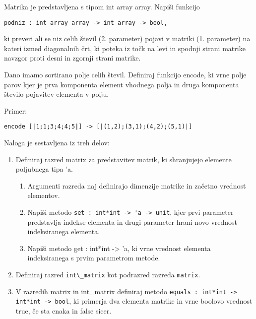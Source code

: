 \begin{ex}
Matrika je predstavljena s tipom int array array. Napi\v si funkcijo 
\begin{lstlisting}
podniz : int array array -> int array -> bool,
\end{lstlisting}
ki preveri ali se niz celih \v stevil (2. parameter) pojavi v matriki (1. parameter) na kateri izmed diagonalnih \v crt, ki poteka iz to\v ck na levi in spodnji strani matrike navzgor proti desni in zgornji strani matrike.


\end{ex} 
\begin{ex}
Dano imamo sortirano polje celih \v stevil. Definiraj funkcijo encode, ki vrne polje parov kjer je prva komponenta element vhodnega polja in druga komponenta \v stevilo pojavitev elementa v polju.   

Primer:
\begin{lstlisting}
encode [|1;1;3;4;4;5|] -> [|(1,2);(3,1);(4,2);(5,1)|]
\end{lstlisting}
\end{ex} 
\begin{ex} Naloga je sestavljena iz treh delov:
\begin{enumerate}
  \item  Definiraj razred matrix za predstavitev matrik, ki shranjujejo
  elemente poljubnega tipa 'a.
\begin{enumerate}
    \item Argumenti razreda naj definirajo dimenzije matrike in za\v cetno
  vrednost elementov.
  \item Napi\v si metodo 
  \lstinline{set : int*int -> 'a -> unit}, kjer prvi parameter
  predstavlja indekse elementa in drugi parameter hrani novo vrednost
  indeksiranega elementa.
  \item Napi\v si metodo get : int*int -> 'a, ki vrne vrednost elementa
  indeksiranega s prvim parametrom metode.
\end{enumerate}
       
  \item Definiraj razred \lstinline{int\_matrix} kot podrazred razreda \lstinline{matrix}.

  \item V razredih matrix in int\_matrix definiraj metodo 
  \lstinline{equals : int*int -> int*int -> bool},
    ki primerja dva elementa matrike in vrne
  boolovo vrednost true, \v ce sta enaka in false sicer.
\end{enumerate}


\end{ex} 
